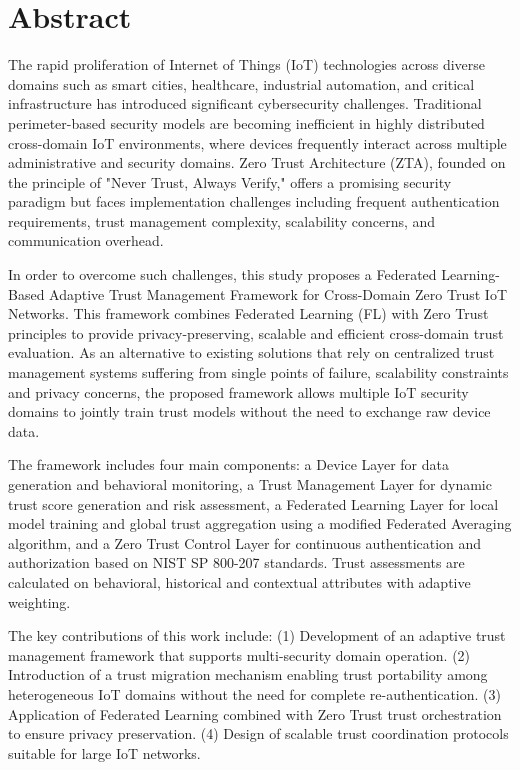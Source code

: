 \chapter*{Abstract}

The rapid proliferation of Internet of Things (IoT) technologies across diverse domains such as smart cities, healthcare, industrial automation, and critical infrastructure has introduced significant cybersecurity challenges. Traditional perimeter-based security models are becoming inefficient in highly distributed cross-domain IoT environments, where devices frequently interact across multiple administrative and security domains. Zero Trust Architecture (ZTA), founded on the principle of "Never Trust, Always Verify," offers a promising security paradigm but faces implementation challenges including frequent authentication requirements, trust management complexity, scalability concerns, and communication overhead.


In order to overcome such challenges, this study proposes a Federated Learning-Based Adaptive Trust Management Framework for Cross-Domain Zero Trust IoT Networks. This framework combines Federated Learning (FL) with Zero Trust principles to provide privacy-preserving, scalable and efficient cross-domain trust evaluation. As an alternative to existing solutions that rely on centralized trust management systems suffering from single points of failure, scalability constraints and privacy concerns, the proposed framework allows multiple IoT security domains to jointly train trust models without the need to exchange raw device data.


The framework includes four main components: a Device Layer for data generation and behavioral monitoring, a Trust Management Layer for dynamic trust score generation and risk assessment, a Federated Learning Layer for local model training and global trust aggregation using a modified Federated Averaging algorithm, and a Zero Trust Control Layer for continuous authentication and authorization based on NIST SP 800-207 standards. Trust assessments are calculated on behavioral, historical and contextual attributes with adaptive weighting.


The key contributions of this work include: (1) Development of an adaptive trust management framework that supports multi-security domain operation. (2) Introduction of a trust migration mechanism enabling trust portability among heterogeneous IoT domains without the need for complete re-authentication. (3) Application of Federated Learning combined with Zero Trust trust orchestration to ensure privacy preservation. (4) Design of scalable trust coordination protocols suitable for large IoT networks.


